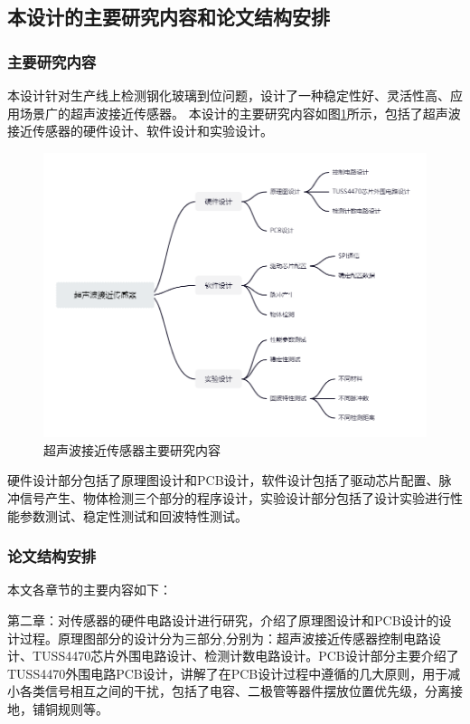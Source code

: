     
\subsection{本设计的主要研究内容和论文结构安排}
\subsubsection{主要研究内容}
本设计针对生产线上检测钢化玻璃到位问题，设计了一种稳定性好、灵活性高、应用场景广的超声波接近传感器。
本设计的主要研究内容如图\ref{超声波接近传感器主要研究内容}所示，包括了超声波接近传感器的硬件设计、软件设计和实验设计。
\begin{figure}[ht]
	\centering
	\includegraphics[width=12cm]{figure/overall designment.png}
	\caption{超声波接近传感器主要研究内容}
	\label{超声波接近传感器主要研究内容}
\end{figure}

硬件设计部分包括了原理图设计和PCB设计，软件设计包括了驱动芯片配置、脉冲信号产生、物体检测三个部分的程序设计，实验设计部分包括了设计实验进行性能参数测试、稳定性测试和回波特性测试。

\subsubsection{论文结构安排}
本文各章节的主要内容如下：

第二章：对传感器的硬件电路设计进行研究，介绍了原理图设计和PCB设计的设计过程。原理图部分的设计分为三部分,分别为：超声波接近传感器控制电路设计、TUSS4470芯片外围电路设计、检测计数电路设计。PCB设计部分主要介绍了TUSS4470外围电路PCB设计，讲解了在PCB设计过程中遵循的几大原则，用于减小各类信号相互之间的干扰，包括了电容、二极管等器件摆放位置优先级，分离接地，铺铜规则等。


